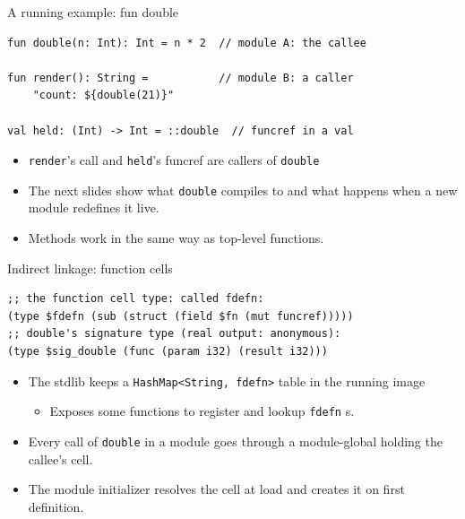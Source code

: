 \documentclass[10pt,presentation]{beamer}
\begin{document}
\begin{frame}[label={sec:orgd96c8e4},fragile]{A running example: fun double}
 \begin{verbatim}
fun double(n: Int): Int = n * 2  // module A: the callee

fun render(): String =           // module B: a caller
    "count: ${double(21)}"

val held: (Int) -> Int = ::double  // funcref in a val
\end{verbatim}

\begin{itemize}
\item \texttt{render}'s call and \texttt{held}'s funcref are callers of \texttt{double}
\item The next slides show what \texttt{double} compiles to and what happens when
a new module redefines it live.
\item Methods work in the same way as top-level functions.
\end{itemize}
\end{frame}
\begin{frame}[label={sec:orga7568a5},fragile]{Indirect linkage: function cells}
 \begin{verbatim}
;; the function cell type: called fdefn:
(type $fdefn (sub (struct (field $fn (mut funcref)))))
;; double's signature type (real output: anonymous):
(type $sig_double (func (param i32) (result i32)))
\end{verbatim}
\begin{itemize}
\item The stdlib keeps a \texttt{HashMap<String, fdefn>} table in the running
image
\begin{itemize}
\item Exposes some functions to register and lookup \texttt{fdefn} s.
\end{itemize}
\item Every call of \texttt{double} in a module goes through a module-global
holding the callee's cell.
\item The module initializer resolves the cell at load and creates it on
first definition.
\end{itemize}
\end{frame}
\end{document}
